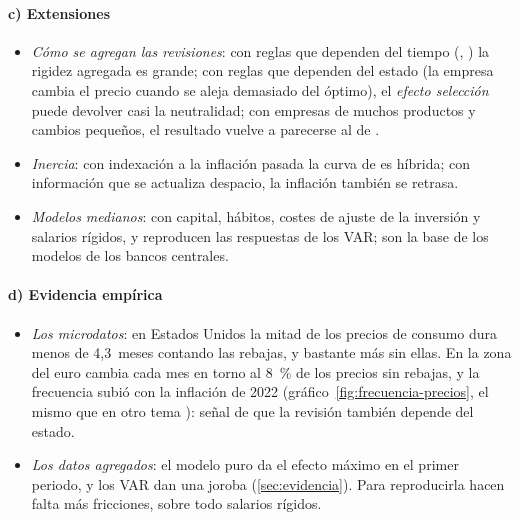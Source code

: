 \documentclass[11pt]{article}
\begin{document}
\paragraph{c) Extensiones}
\begin{itemize}
\item \emph{Cómo se agregan las revisiones}: con reglas que dependen del tiempo (, ) la rigidez agregada es grande; con reglas que dependen del estado (la empresa cambia el precio cuando se aleja demasiado del óptimo), el \emph{efecto selección} puede devolver casi la neutralidad\nocite{CaplinSpulber1987Menu,GolosovLucas2007Menu}; con empresas de muchos productos y cambios pequeños, el resultado vuelve a parecerse al de \nocite{Midrigan2011Menu,NakamuraSteinsson2010Monetary}.
\item \emph{Inercia}: con indexación a la inflación pasada la curva de  es híbrida\nocite{GaliGertler1999Inflation}; con información que se actualiza despacio, la inflación también se retrasa\nocite{MankiwReis2002Sticky}.
\item \emph{Modelos medianos}: con capital, hábitos, costes de ajuste de la inversión y salarios rígidos, \textcite{ChristianoEichenbaumEvans2005} y \textcite{SmetsWouters2007Shocks} reproducen las respuestas de los VAR; son la base de los modelos de los bancos centrales.
\end{itemize}

\paragraph{d) Evidencia empírica}
\begin{itemize}
\item \emph{Los microdatos}: en Estados Unidos la mitad de los precios de consumo dura menos de 4,3~meses contando las rebajas\nocite{BilsKlenow2004Some}, y bastante más sin ellas\nocite{NakamuraSteinsson2008Five}. En la zona del euro cambia cada mes en torno al 8~\% de los precios sin rebajas, y la frecuencia subió con la inflación de 2022 (gráfico~\ref{fig:frecuencia-precios}, el mismo que en otro tema ): señal de que la revisión también depende del estado\nocite{GautierEtAl2024New,GautierEtAl2026WP3181}.
\item \emph{Los datos agregados}: el modelo puro da el efecto máximo en el primer periodo, y los VAR dan una joroba (\ref{sec:evidencia}). Para reproducirla hacen falta más fricciones, sobre todo salarios rígidos\nocite{ChristianoEichenbaumEvans2005}.
\end{itemize}
\end{document}
